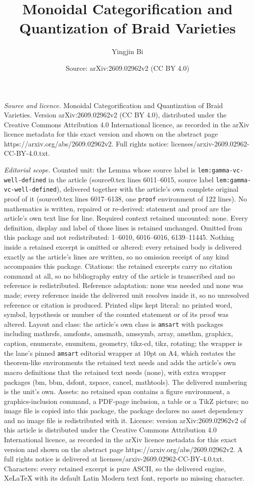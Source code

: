 \documentclass[10pt,a4paper]{amsart}
\title[Monoidal Categorification and Quantization of Braid Varietie]{Monoidal Categorification and Quantization of Braid Varieties}
\author{Yingjin Bi}
\date{Source: arXiv:2609.02962v2 (CC BY 4.0)}
\begin{document}
\maketitle

\noindent\emph{Source and licence.} Monoidal Categorification and Quantization of Braid Varieties. Version arXiv:2609.02962v2 (CC BY 4.0), distributed under the Creative Commons Attribution 4.0 International licence, as recorded in the arXiv licence metadata for this exact version and shown on the abstract page https://arxiv.org/abs/2609.02962v2. Full rights notice: licenses/arxiv-2609.02962-CC-BY-4.0.txt.\par\smallskip

\noindent\textit{Editorial scope.} Counted unit: the Lemma whose source label is \texttt{lem:gamma-vc-well-defined} in the article (source0.tex lines 6011--6015, source label \texttt{lem:gamma-vc-well-defined}), delivered together with the article's own complete original proof of it (source0.tex lines 6017--6138, one \texttt{proof} environment of 122 lines). No mathematics is written, repaired or re-derived: statement and proof are the article's own text line for line. Required context retained uncounted: none. Every definition, display and label of those lines is retained unchanged. Omitted from this package and not redistributed: 1--6010, 6016--6016, 6139--11445. Nothing inside a retained excerpt is omitted or altered: every retained body is delivered exactly as the article's lines are written, so no omission receipt of any kind accompanies this package. Citations: the retained excerpts carry no citation command at all, so no bibliography entry of the article is transcribed and no reference is redistributed. Reference adaptation: none was needed and none was made; every reference inside the delivered unit resolves inside it, so no unresolved reference or citation is produced. Printed slips kept literal: no printed word, symbol, hypothesis or number of the counted statement or of its proof was altered. Layout and class: the article's own class is \texttt{amsart} with packages including mathrsfs, amsfonts, amsmath, amssymb, array, amsthm, graphicx, caption, enumerate, enumitem, geometry, tikz-cd, tikz, rotating; the wrapper is the lane's pinned \texttt{amsart} editorial wrapper at 10pt on A4, which restates the theorem-like environments the retained text needs and adds the article's own macro definitions that the retained text needs (none), with extra wrapper packages (bm, bbm, dsfont, xspace, cancel, mathtools). The delivered numbering is the unit's own. Assets: no retained span contains a figure environment, a graphics-inclusion command, a PDF-page inclusion, a table or a TikZ picture; no image file is copied into this package, the package declares no asset dependency and no image file is redistributed with it. Licence: version arXiv:2609.02962v2 of this article is distributed under the Creative Commons Attribution 4.0 International licence, as recorded in the arXiv licence metadata for this exact version and shown on the abstract page https://arxiv.org/abs/2609.02962v2. A full rights notice is delivered at licenses/arxiv-2609.02962-CC-BY-4.0.txt. Characters: every retained excerpt is pure ASCII, so the delivered engine, XeLaTeX with its default Latin Modern text font, reports no missing character.
\end{document}
